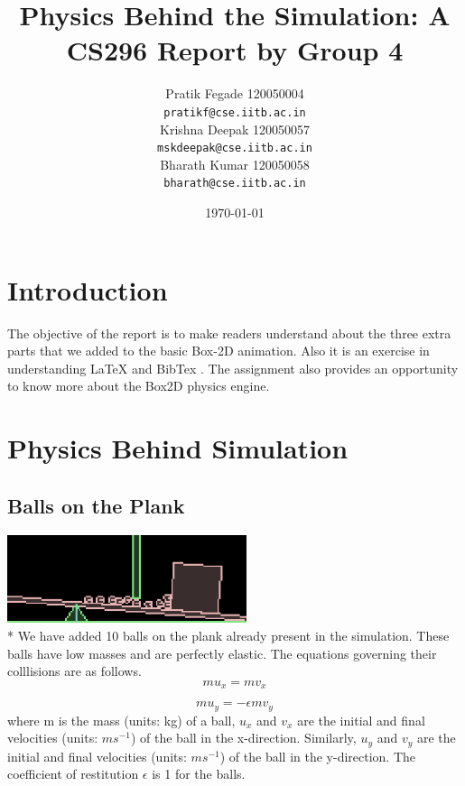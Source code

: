 \documentclass{article}
\begin{document}
\title{Physics Behind the Simulation: A CS296 Report by Group 4}
\author{Pratik Fegade 120050004\\
\texttt{pratikf@cse.iitb.ac.in}\\
Krishna Deepak 120050057\\
\texttt{mskdeepak@cse.iitb.ac.in}\\
Bharath Kumar 120050058\\
\texttt{bharath@cse.iitb.ac.in}\\}
\date{\today}
\maketitle

\section{Introduction}
\hspace{1 cm}
The objective of the report is to make readers understand about the three extra parts that we added to the basic Box-2D animation. 
Also it is an exercise in understanding LaTeX \cite{lamport94} and BibTex \cite{bibtex_site} \cite{bibtex_wiki}. The assignment also provides an opportunity to know more about the Box2D physics engine. \cite{Box2d}

\section{Physics Behind Simulation}


\subsection{Balls on the Plank}
\includegraphics[width=7cm]{_-0}
\\*
\hspace{1 cm}
We have added 10 balls on the plank already present in the simulation. These balls have low masses and are perfectly elastic. The equations governing their colllisions are as follows.
\begin{equation}
	mu_x = mv_x
\end{equation}

\begin{equation}
	mu_y = - \epsilon mv_y
\end{equation}
where m is the mass (units: kg) of a ball, $u_x$ and $v_x$ are the initial and final velocities (units: $ms^{-1}$) of the ball in the x-direction. Similarly, $u_y$ and $v_y$ are the initial and final velocities (units: $ms^{-1}$) of the ball in the y-direction. The coefficient of restitution $\epsilon$ is 1 for the balls.
\end{document}
